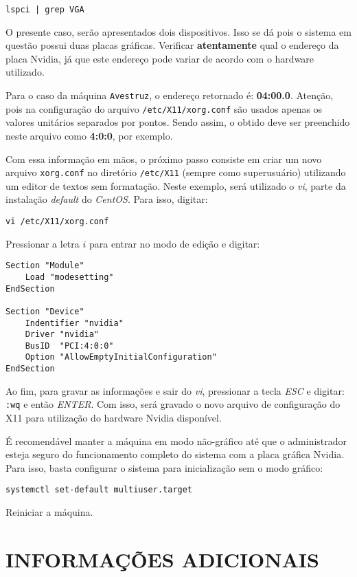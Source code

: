 \documentclass[twoside,a4paper,12pt,english]{inac17}
\begin{document}
\texttt{lspci | grep VGA}

O presente caso, serão apresentados dois dispositivos. Isso se dá pois o 
sistema em questão possui duas placas gráficas. Verificar \textbf{atentamente} 
qual o endereço da placa Nvidia, já que este endereço pode variar de acordo 
com o hardware utilizado.

\begin{shadedbox}
Para o caso da máquina \texttt{Avestruz}, o endereço retornado é: \textbf{04:00.0}. 
Atenção, pois na configuração do arquivo \texttt{/etc/X11/xorg.conf} são usados 
apenas os valores unitários separados por pontos. Sendo assim, o obtido deve 
ser preenchido neste arquivo como \textbf{4:0:0}, por exemplo.
\end{shadedbox}

Com essa informação em mãos, o próximo passo consiste em criar um novo arquivo 
\texttt{xorg.conf} no diretório \texttt{/etc/X11} (sempre como superusuário) 
utilizando um editor de textos sem formatação. Neste exemplo, será utilizado o 
\textit{vi}, parte da instalação \textit{default} do \textit{CentOS}. Para isso, 
digitar:

\texttt{vi /etc/X11/xorg.conf}

Pressionar a letra $i$ para entrar no modo de edição e digitar:

\begin{Verbatim}[tabsize=4]
Section "Module"
	Load "modesetting"
EndSection

Section "Device"
	Indentifier "nvidia"
	Driver "nvidia"
	BusID  "PCI:4:0:0"
	Option "AllowEmptyInitialConfiguration"
EndSection
\end{Verbatim}

Ao fim, para gravar as informações e sair do \textit{vi}, pressionar a tecla 
\textit{ESC} e digitar: \texttt{:wq} e então \textit{ENTER}. Com isso, será 
gravado o novo arquivo de configuração do X11 para utilização do hardware 
Nvidia disponível.

É recomendável manter a máquina em modo não-gráfico até que o administrador 
esteja seguro do funcionamento completo do sistema com a placa gráfica Nvidia. 
Para isso, basta configurar o sistema para inicialização sem o modo gráfico:

\texttt{systemctl set-default multiuser.target}

Reiniciar a máquina.

\section{INFORMAÇÕES ADICIONAIS}
\end{document}
